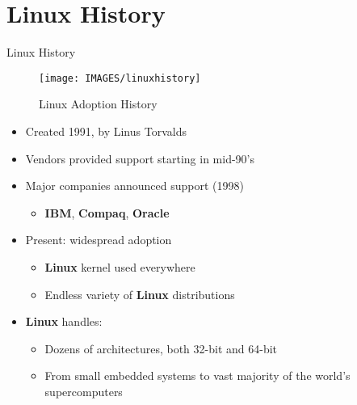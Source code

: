 \section{Linux History}

\begin{frame}
   {Linux History}
   \begin{multicols}{2}
      \begin{figure}[H]
         \texttt{[image: IMAGES/linuxhistory]}
         \caption{Linux Adoption History}
      \end{figure}
      \begin{itemize}
         \item Created 1991, by Linus Torvalds
         \item Vendors provided support starting in mid-90's
         \item Major companies announced support (1998)
         \begin{itemize}
            \item \textbf{IBM}, \textbf{Compaq}, \textbf{Oracle}
         \end{itemize}

         \item Present: widespread adoption
         \begin{itemize}
            \item \textbf{Linux} kernel used everywhere
            \item Endless variety of \textbf{Linux} distributions
         \end{itemize}
         \item
         \textbf{Linux} handles:
         \begin{itemize}
            \item Dozens of architectures, both 32-bit and 64-bit
            \item From small embedded systems to vast majority of
            the world's supercomputers
         \end{itemize}
      \end{itemize}
   \end{multicols}


\end{frame}

